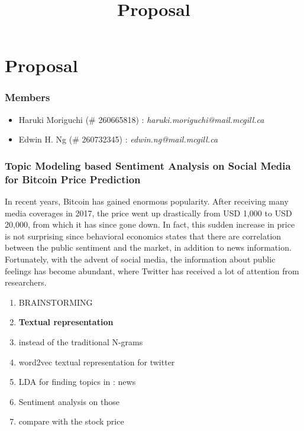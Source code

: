 \documentclass[12pt,a4paper]{report}
\begin{document}
\title{Proposal\\
}


\setcounter{page}{1}
\thispagestyle{empty} 


\chapter*{Proposal}
\subsection*{Members}
\begin{itemize}
\item Haruki Moriguchi (\# 260665818) : \textit{haruki.moriguchi@mail.mcgill.ca}
\item Edwin H. Ng (\# 260732345) : \textit{edwin.ng@mail.mcgill.ca}
\end{itemize}
\subsection*{Topic Modeling based Sentiment Analysis on Social Media for Bitcoin Price Prediction}
\par \qquad In recent years, Bitcoin has gained enormous popularity. After receiving many media coverages in 2017, the  price went up drastically from USD 1,000 to USD 20,000, from which it has since gone down. In fact, this sudden increase in price is not surprising since behavioral economics states that there are correlation between the public sentiment and the market, in addition to news information. Fortunately, with the advent of social media, the information about public feelings has become abundant, where Twitter has received a lot of attention from researchers.
\\
\begin{enumerate}
\item BRAINSTORMING
\item \textbf{Textual representation}
\item instead of the traditional N-grams
\item  word2vec textual representation  for twitter
\item LDA for finding topics in : news 
\item Sentiment analysis on those
\item compare with the stock price
\end{enumerate}
\end{document}
